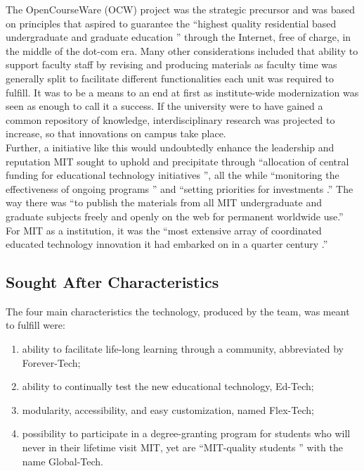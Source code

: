 \documentclass[a4paper]{article}
\begin{document}
\noindent
The OpenCourseWare (OCW) project was the strategic precursor and was based on principles that aspired to guarantee the ``highest quality residential based undergraduate and graduate education \cite{OCW}'' through the Internet, free of charge, in the middle of the dot-com era. Many other considerations included that ability to support faculty staff by revising and producing materials as faculty time was generally split to facilitate different functionalities each unit was required to fulfill. It was to be a means to an end at first as institute-wide modernization was seen as enough to call it a success. If the university were to have gained a common repository of knowledge, interdisciplinary research was projected to increase, so that innovations on campus take place. \\

\noindent
Further, a initiative like this would undoubtedly enhance the leadership and reputation MIT sought to uphold and precipitate through ``allocation of central funding for educational technology initiatives \cite{OCW}'', all the while ``monitoring the effectiveness of ongoing programs \cite{OCW}'' and ``setting priorities for investments \cite{OCW}.'' The way there was ``to publish the materials from all MIT undergraduate and graduate subjects freely and openly on the web for permanent worldwide use.'' For MIT as a institution, it was the ``most extensive array of coordinated educated technology innovation it had embarked on in a quarter century \cite{OCW}.''

\subsection{Sought After Characteristics}
The four main characteristics the technology, produced by the team, was meant to fulfill were:
\begin{enumerate}
\item ability to facilitate life-long learning through a community, abbreviated by Forever-Tech;
\item ability to continually test the new educational technology, Ed-Tech;
\item modularity, accessibility, and easy customization, named Flex-Tech;
\item possibility to participate in a degree-granting program for students who will never in their lifetime visit MIT, yet are ``MIT-quality students \cite{OCW}'' with the name Global-Tech. 
\end{enumerate}
\end{document}
